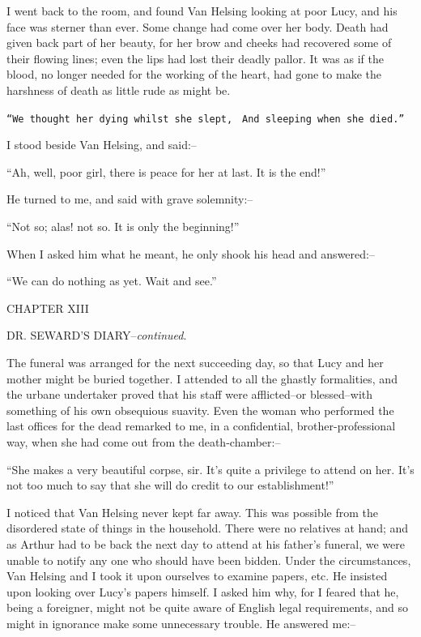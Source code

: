 \documentclass[12pt,openright]{book}
\begin{document}
I went back to the room, and found Van Helsing looking at poor Lucy, and his face was sterner than ever. Some change had come over her body. Death had given back part of her beauty, for her brow and cheeks had recovered some of their flowing lines; even the lips had lost their deadly pallor. It was as if the blood, no longer needed for the working of the heart, had gone to make the harshness of death as little rude as might be.

\texttt{“We thought her dying whilst she slept,}
\texttt{    And sleeping when she died.”}

I stood beside Van Helsing, and said:–

“Ah, well, poor girl, there is peace for her at last. It is the end!”

He turned to me, and said with grave solemnity:–

“Not so; alas! not so. It is only the beginning!”

When I asked him what he meant, he only shook his head and answered:–

“We can do nothing as yet. Wait and see.”

CHAPTER XIII

DR. SEWARD’S DIARY–\textit{continued}.

The funeral was arranged for the next succeeding day, so that Lucy and her mother might be buried together. I attended to all the ghastly formalities, and the urbane undertaker proved that his staff were afflicted–or blessed–with something of his own obsequious suavity. Even the woman who performed the last offices for the dead remarked to me, in a confidential, brother-professional way, when she had come out from the death-chamber:–

“She makes a very beautiful corpse, sir. It’s quite a privilege to attend on her. It’s not too much to say that she will do credit to our establishment!”

I noticed that Van Helsing never kept far away. This was possible from the disordered state of things in the household. There were no relatives at hand; and as Arthur had to be back the next day to attend at his father’s funeral, we were unable to notify any one who should have been bidden. Under the circumstances, Van Helsing and I took it upon ourselves to examine papers, etc. He insisted upon looking over Lucy’s papers himself. I asked him why, for I feared that he, being a foreigner, might not be quite aware of English legal requirements, and so might in ignorance make some unnecessary trouble. He answered me:–
\end{document}
